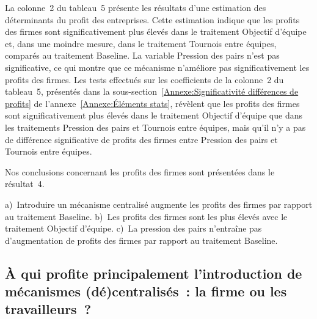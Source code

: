 \begin{Article}
\begin{refsection}[Lebourges]
La colonne~2 du tableau~5 présente les résultats d'une estimation des
déterminants du profit des entreprises. Cette estimation indique que les
profits des firmes sont significativement plus élevés dans le traitement
Objectif d'équipe et, dans une moindre mesure, dans le traitement
Tournois entre équipes, comparés au traitement Baseline. La variable
Pression des pairs n'est pas significative, ce qui montre que ce
mécanisme n'améliore pas significativement les profits des firmes. Les
tests effectués sur les coefficients de la colonne~2 du tableau~5,
présentés dans la sous-section~\ref{Annexe:Significativité différences de profits} de l'annexe~\ref{Annexe:Éléments stats}, révèlent que
les profits des firmes sont significativement plus élevés dans le
traitement Objectif d'équipe que dans les traitements Pression des pairs
et Tournois entre équipes, mais qu'il n'y a pas de différence
significative de profits des firmes entre Pression des pairs et Tournois
entre équipes.

Nos conclusions concernant les profits des firmes sont présentées dans
le résultat~4.

\vspace{.2cm}
\begin{resultat}
a)~Introduire un mécanisme centralisé augmente les
profits des firmes par rapport au traitement Baseline. b)~Les profits
des firmes sont les plus élevés avec le traitement Objectif d'équipe.
c)~La pression des pairs n'entraîne pas d'augmentation de profits des
firmes par rapport au traitement Baseline.
\end{resultat}

\subsection{À qui profite principalement l'introduction de mécanismes
(dé)centralisés~: la firme ou les travailleurs~?}


\end{refsection}
\end{Article}
